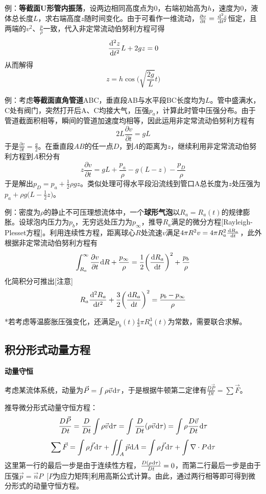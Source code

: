 \documentclass[a4paper,UTF8,fontset=windows]{ctexart}
\newcommand*{\dr}{\hspace{0.07em}\mathrm{d}}
\begin{document}
例：\textbf{等截面U形管内振荡}，设两边相同高度点为0，右端初始高为$h$，速度为0，液体总长度$L$，求右端高度$z$随时间变化。由于可看作一维流动，$\frac{\partial v}{\partial t}=\frac{\dr^2z}{\dr t^2}$恒定，且两端的$v^2$、$\frac{p}{\rho}$一致，代入非定常流动伯努利方程可得
$$\frac{\dr^2z}{\dr t^2}L+2gz=0$$
从而解得
$$z=h\cos\bigg(\sqrt{\frac{2g}{L}}t\bigg)$$

例：考虑\textbf{等截面直角管道}ABC，垂直段AB与水平段BC长度均为$L$。管中盛满水，C处有阀门，突然打开后A、C均接大气，压强$p_a$，计算此时管中压强分布。由于管道截面积相等，瞬间的管道加速度均相等，因此运用非定常流动伯努利方程有
$$2L\frac{\partial v}{\partial t}=gL$$
于是$\frac{\partial v}{\partial t}=\frac{g}{2}$。在垂直段$AB$的任一点$D$，到$A$的距离为$z$，继续利用非定常流动伯努利方程到$A$积分有$$z\frac{\partial v}{\partial t}=gL+\frac{p_a}{\rho}-g(L-z)-\frac{p_D}{\rho}$$
于是解出$p_D=p_a+\frac{1}{2}\rho gz$。类似处理可得水平段沿流线到管口A总长度为$z$处压强为$p_a+\rho g\big(L-\frac{1}{2}z\big)$。

例：密度为$\rho$的静止不可压理想流体中，一个\textbf{球形气泡}以$R_a=R_a(t)$的规律膨胀。设球泡内压力为$p_b$，无穷远处压力为$p_\infty$，推导$R_a$满足的微分方程[Rayleigh-Plesset方程]。利用连续性方程，距离球心$R$处流速$v$满足$4\pi R^2v=4\pi R_a^2\frac{\dr R_a}{\dr t}$，此外根据非定常流动伯努利方程有
$$\int_{R_a}^\infty\frac{\partial v}{\partial t}\dr R+\frac{p_\infty}{\rho}=\frac{1}{2}\bigg(\frac{\dr R_a}{\dr t}\bigg)^2+\frac{p_b}{\rho}$$
化简积分可推出[注意]
$$R_a\frac{\dr^2R_a}{\dr t^2}+\frac{3}{2}\bigg(\frac{\dr R_a}{\dr t}\bigg)^2=\frac{p_b-p_\infty}{\rho}$$

*若考虑等温膨胀压强变化，还满足$p_b(t)\frac{4}{3}\pi R_a^3(t)$为常数，需要联合求解。

\subsection{积分形式动量方程}
\textbf{动量守恒}

考虑某流体系统，动量为$\vec{P}=\int\rho\vec{v}\dr\tau$，于是根据牛顿第二定律有$\frac{D\vec{P}}{Dt}=\sum\vec{F}$。

推导微分形式动量守恒方程：
$$\frac{D\vec{P}}{Dt}=\frac{D}{Dt}\int\rho\vec{v}\dr\tau=\int\frac{D}{Dt}(\rho\vec{v}\dr\tau)=\int\rho\frac{D\vec{v}}{Dt}\dr\tau$$
$$\sum\vec{F}=\int\rho\vec{f}\dr\tau+\iint_A\vec{p}\dr A=\int\rho\vec{f}\dr\tau+\int\nabla\cdot P\dr\tau$$
这里第一行的最后一步是由于连续性方程，$\frac{D(\rho\dr\tau)}{Dt}=0$，而第二行最后一步是由于压强$\vec{p}=\vec{n}P$\ [$P$为应力矩阵]利用高斯公式计算。由此，通过两行相等即可得到微分形式的动量守恒方程。
\end{document}
